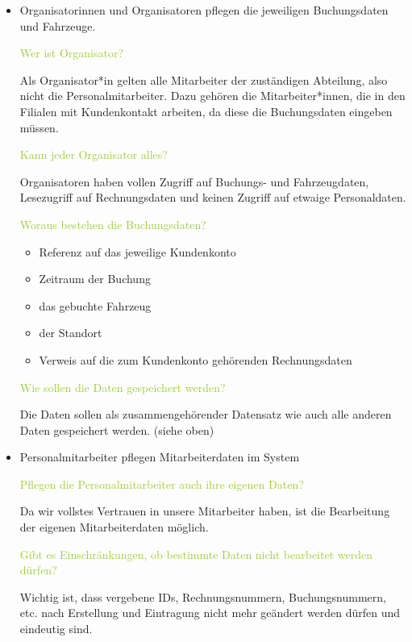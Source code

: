 \begin{itemize}
    \item Organisatorinnen und Organisatoren pflegen die jeweiligen Buchungsdaten und Fahrzeuge. 
    
    \textcolor{YellowGreen}{Wer ist Organisator?}

    \textcolor{NavyBlue}{Als Organisator*in gelten alle Mitarbeiter der zuständigen Abteilung, also nicht die Personalmitarbeiter. Dazu gehören die Mitarbeiter*innen, die in den Filialen mit Kundenkontakt arbeiten, da diese die Buchungsdaten eingeben müssen.}

    \textcolor{YellowGreen}{Kann jeder Organisator alles?}

    \textcolor{NavyBlue}{Organisatoren haben vollen Zugriff auf Buchungs- und Fahrzeugdaten, Lesezugriff auf Rechnungsdaten und keinen Zugriff auf etwaige Personaldaten.}

    \textcolor{YellowGreen}{Woraus bestehen die Buchungsdaten?}

    \textcolor{NavyBlue}{
        \begin{itemize}
            \item Referenz auf das jeweilige Kundenkonto
            \item Zeitraum der Buchung
            \item das gebuchte Fahrzeug
            \item der Standort
            \item Verweis auf die zum Kundenkonto gehörenden Rechnungsdaten 
        \end{itemize}
    }

    \textcolor{YellowGreen}{Wie sollen die Daten gespeichert werden?}

    \textcolor{NavyBlue}{Die Daten sollen als zusammengehörender Datensatz wie auch alle anderen Daten gespeichert werden. (siehe oben)}

    \item Personalmitarbeiter pflegen Mitarbeiterdaten im System  
    
    \textcolor{YellowGreen}{Pflegen die Personalmitarbeiter auch ihre eigenen Daten?}

    \textcolor{NavyBlue}{Da wir vollstes Vertrauen in unsere Mitarbeiter haben, ist die Bearbeitung der eigenen Mitarbeiterdaten möglich.}

    \textcolor{YellowGreen}{Gibt es Einschränkungen, ob bestimmte Daten nicht bearbeitet werden dürfen?}

    \textcolor{NavyBlue}{Wichtig ist, dass vergebene IDs, Rechnungsnummern, Buchungsnummern, etc. nach Erstellung und Eintragung nicht mehr geändert werden dürfen und eindeutig sind. }


\end{itemize}
